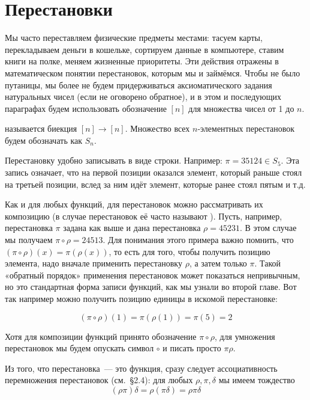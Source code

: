 \section{Перестановки}

Мы часто переставляем физические предметы местами: тасуем карты, перекладываем деньги в кошельке, сортируем данные в компьютере, ставим книги на полке, меняем жизненные приоритеты. Эти действия отражены в математическом понятии перестановок, которым мы и займёмся. Чтобы не было путаницы, мы более не будем придерживаться аксиоматического задания натуральных чисел (если не оговорено обратное), и в этом и последующих параграфах будем использовать обозначение $[n]$ для множества чисел от 1 до $n$.

\begin{definition}
 называется биекция $[n]\to[n]$. Множество всех $n$-элементных перестановок будем обозначать как $S_n$.
\end{definition}

Перестановку удобно записывать в виде строки. Например: $\pi = 35124 \in S_5$. Эта запись означает, что на первой позиции оказался элемент, который раньше стоял на третьей позиции, вслед за ним идёт элемент, которые ранее стоял пятым и т.д.

Как и для любых функций, для перестановок можно рассматривать их композицию (в случае перестановок её часто называют ). Пусть, например, перестановка $\pi$ задана как выше и дана перестановка $\rho = 45231$. В этом случае мы получаем $\pi \circ \rho = 24513$. Для понимания этого примера важно помнить, что $(\pi\circ\rho)(x) = \pi(\rho(x))$, то есть для того, чтобы получить позицию элемента, надо вначале применить перестановку $\rho$, а затем только $\pi$. Такой «обратный порядок» применения перестановок может показаться непривычным, но это стандартная форма записи функций, как мы узнали во второй главе. Вот так например можно получить позицию единицы в искомой перестановке:

$$(\pi\circ\rho) (1) = \pi(\rho(1)) = \pi(5) = 2$$

Хотя для композиции функций принято обозначение $\pi\circ\rho$, для умножения перестановок мы будем опускать символ $\circ$ и писать просто $\pi\rho$.

Из того, что перестановка~— это функция, сразу следует ассоциативность перемножения перестановок (см.~\S2.4): для любых $\rho, \pi, \delta$ мы имеем тождество
$$(\rho\pi)\delta = \rho(\pi\delta) = \rho\pi\delta$$

